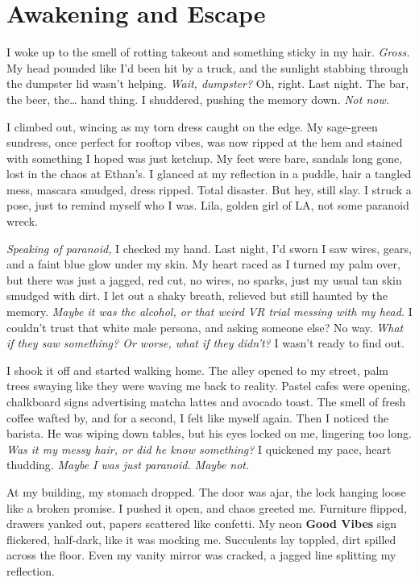 \documentclass[12pt,oneside]{book} %
\begin{document}
\chapter{Awakening and Escape}

I woke up to the smell of rotting takeout and something sticky in my hair. \textit{Gross.} My head pounded like I’d been hit by a truck, and the sunlight stabbing through the dumpster lid wasn’t helping. \textit{Wait, dumpster?} Oh, right. Last night. The bar, the beer, the… hand thing. I shuddered, pushing the memory down. \textit{Not now.}

I climbed out, wincing as my torn dress caught on the edge. My sage-green sundress, once perfect for rooftop vibes, was now ripped at the hem and stained with something I hoped was just ketchup. My feet were bare, sandals long gone, lost in the chaos at Ethan’s. I glanced at my reflection in a puddle, hair a tangled mess, mascara smudged, dress ripped. Total disaster. But hey, still slay. I struck a pose, just to remind myself who I was. Lila, golden girl of LA, not some paranoid wreck.

\textit{Speaking of paranoid,} I checked my hand. Last night, I’d sworn I saw wires, gears, and a faint blue glow under my skin. My heart raced as I turned my palm over, but there was just a jagged, red cut, no wires, no sparks, just my usual tan skin smudged with dirt. I let out a shaky breath, relieved but still haunted by the memory. \textit{Maybe it was the alcohol, or that weird VR trial messing with my head.} I couldn’t trust that white male persona, and asking someone else? No way. \textit{What if they saw something? Or worse, what if they didn’t?} I wasn’t ready to find out.

I shook it off and started walking home. The alley opened to my street, palm trees swaying like they were waving me back to reality. Pastel cafes were opening, chalkboard signs advertising matcha lattes and avocado toast. The smell of fresh coffee wafted by, and for a second, I felt like myself again. Then I noticed the barista. He was wiping down tables, but his eyes locked on me, lingering too long. \textit{Was it my messy hair, or did he know something?} I quickened my pace, heart thudding. \textit{Maybe I was just paranoid. Maybe not.}

At my building, my stomach dropped. The door was ajar, the lock hanging loose like a broken promise. I pushed it open, and chaos greeted me. Furniture flipped, drawers yanked out, papers scattered like confetti. My neon \textbf{Good Vibes} sign flickered, half-dark, like it was mocking me. Succulents lay toppled, dirt spilled across the floor. Even my vanity mirror was cracked, a jagged line splitting my reflection.
\end{document}
